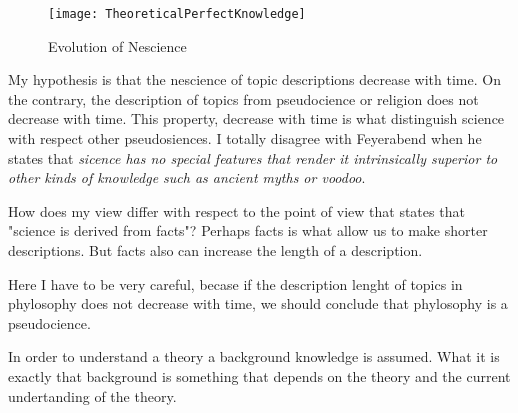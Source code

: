 \begin{figure}[h]
\centering\texttt{[image: TheoreticalPerfectKnowledge]}
\caption{\label{fig:TheoreticalPerfectKnowledge}Evolution of Nescience}
\end{figure}


My hypothesis is that the nescience of topic descriptions decrease with time. On the contrary, the description of topics from pseudocience or religion does not decrease with time. This property, decrease with time is what distinguish science with respect other pseudosiences. I totally disagree with Feyerabend when he states that \emph{sicence has no special features that render it intrinsically superior to other kinds of knowledge such as ancient myths or voodoo}.

How does my view differ with respect to the point of view that states that "science is derived from facts"? Perhaps facts is what allow us to make shorter descriptions. But facts also can increase the length of a description.

Here I have to be very careful, becase if the description lenght of topics in phylosophy does not decrease with time, we should conclude that phylosophy is a pseudocience.

In order to understand a theory a background knowledge is assumed. What it is exactly that background is something that depends on the theory and the current undertanding of the theory.

